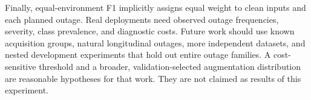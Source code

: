 \documentclass[conference]{IEEEtran}
\begin{document}
Finally, equal-environment F1 implicitly assigns equal weight to clean inputs and each planned outage. Real deployments need observed outage frequencies, severity, class prevalence, and diagnostic costs. Future work should use known acquisition groups, natural longitudinal outages, more independent datasets, and nested development experiments that hold out entire outage families. A cost-sensitive threshold and a broader, validation-selected augmentation distribution are reasonable hypotheses for that work. They are not claimed as results of this experiment.



\end{document}
